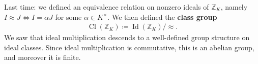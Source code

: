 \begin{remark}

Last time: we defined an equivalence relation on nonzero ideals of
\({\mathbb{Z}}_K\), namely \(I \approx J \iff I = \alpha J\) for some
\(\alpha \in K^{\times}\). We then defined the \textbf{class group}
\begin{align*}
{ \operatorname{Cl}} ({\mathbb{Z}}_K) \coloneqq\operatorname{Id}({\mathbb{Z}}_K) / \approx
.\end{align*}
We saw that ideal multiplication descends to a well-defined group
structure on ideal classes. Since ideal multiplication is commutative,
this is an abelian group, and moreover it is finite.

\end{remark}

\begin{example}


\end{example}
